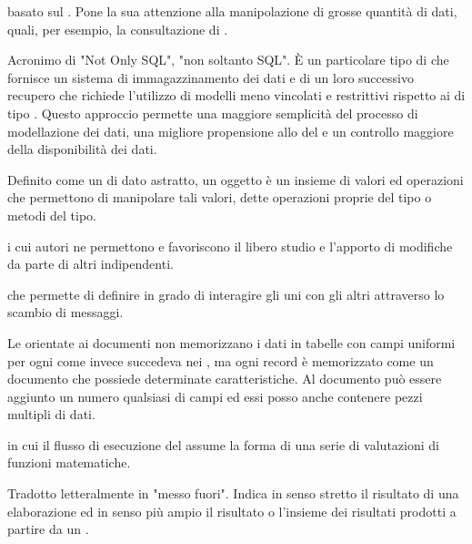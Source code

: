 

{ basato sul  . Pone la sua attenzione alla manipolazione di grosse quantità di dati, quali, per esempio, la consultazione di .}

{Acronimo di "Not Only SQL", "non soltanto SQL". \`{E} un particolare tipo di  che fornisce un sistema di immagazzinamento dei dati e di un loro successivo recupero che richiede l'utilizzo di modelli meno vincolati e restrittivi rispetto ai  di tipo . Questo approccio permette una maggiore semplicità del processo di modellazione dei dati, una migliore propensione allo  del  e un controllo maggiore della disponibilità dei dati.}




{Definito come un  di dato astratto, un oggetto è un insieme di valori ed operazioni che permettono di manipolare tali valori, dette operazioni proprie del tipo o metodi del tipo.}

{ i cui autori ne permettono e favoriscono il libero studio e l'apporto di modifiche da parte di altri  indipendenti.}

{ che permette di definire  in grado di interagire gli uni con gli altri attraverso lo scambio di messaggi.}

{Le  orientate ai documenti non memorizzano i dati in tabelle con campi uniformi per ogni  come invece succedeva nei , ma ogni record è memorizzato come un documento che possiede determinate caratteristiche. Al documento può essere aggiunto un numero qualsiasi di campi ed essi posso anche contenere pezzi multipli di dati.}

{ in cui il flusso di esecuzione del  assume la forma di una serie di valutazioni di funzioni matematiche.}

{Tradotto letteralmente in "messo fuori". Indica in senso stretto il risultato di una elaborazione ed in senso più ampio il risultato o l'insieme dei risultati prodotti a partire da un .}

